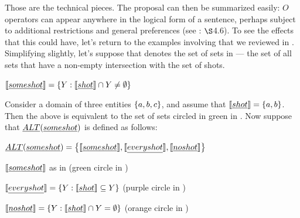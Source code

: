 \documentclass[leqno]{article}
\begin{document}
Those are the technical pieces. The proposal can then be summarized
easily: $O$ operators can appear anywhere in the logical form of a
sentence, perhaps subject to additional restrictions and general
preferences (see \CFS: $\S$4.6). To see the effects that this could
have, let's return to the examples involving  that we
reviewed in . Simplifying slightly, let's
suppose that  denotes the set of sets in 
--- the set of all sets that have a non-empty intersection with the
set of shots.
%
\begin{examples}
\item\label{someshot} $\llbracket\emph{some shot}\rrbracket = \left\{ Y : \llbracket\emph{shot}\rrbracket \cap Y \neq \emptyset \right\}$
\end{examples}
%
Consider a domain of three entities $\left\{ a,b,c \right\}$, and assume that
$\llbracket\emph{shot}\rrbracket = \left\{ a,b \right\}$. Then the above is equivalent to the
set of sets circled in green in . Now suppose that
$\emph{ALT}(\emph{some shot})$ is defined as follows:
%
\begin{examples}
\item\label{altsome} $\emph{ALT}(\emph{some shot}) =  
  \left\{ 
    \llbracket\emph{some shot}\rrbracket, 
    \llbracket\emph{every shot}\rrbracket, 
    \llbracket\emph{no shot}\rrbracket
   \right\}$
  \begin{examples}
  \item $\llbracket\emph{some shot}\rrbracket$ as in  \hfill (green circle in )
  \item $\llbracket\emph{every shot}\rrbracket = \left\{ Y : \llbracket\emph{shot}\rrbracket \subseteq Y \right\}$ \hfill (purple circle in )
  \item $\llbracket\emph{no shot}\rrbracket = \left\{ Y : \llbracket\emph{shot}\rrbracket \cap Y = \emptyset \right\}$  \hfill (orange circle in )
  \end{examples}
\end{examples}
\end{document}
